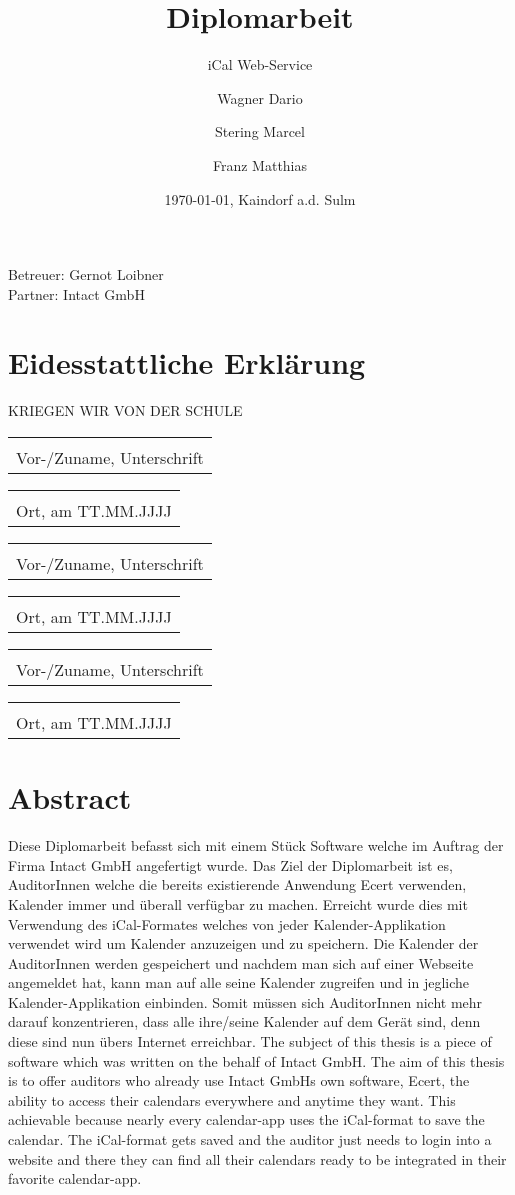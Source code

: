 \documentclass[12pt]{scrartcl}
\author{
  Wagner Dario
  \and
  Stering Marcel
  \and
  Franz Matthias
}
\title{Diplomarbeit}
\subtitle{iCal Web-Service}
\date{\today{}, Kaindorf a.d. Sulm}
\makeatletter
\newcommand{\titledate}[2][2.5in]{%
  \noindent%
  \begin{tabular}{@{}p{#1}@{}}
    \\ \hline \\[-.75\normalbaselineskip]
    #2
  \end{tabular} \hspace{1in}
  \begin{tabular}{@{}p{#1}@{}}
    \\ \hline \\[-.75\normalbaselineskip]
    Ort, am TT.MM.JJJJ
  \end{tabular}
}
\makeatother
\begin{document}
	\begin{titlepage}
		\maketitle
		\begin{center}
			Betreuer: Gernot Loibner\\
			Partner: Intact GmbH
		\end{center}
	\end{titlepage}
	
\section*{Eidesstattliche Erklärung}
\label{sec:eidesstattliche-erklaerung}
KRIEGEN WIR VON DER SCHULE
\vspace*{30px}

\titledate{Vor-/Zuname, Unterschrift}
\vspace*{30px}

\titledate{Vor-/Zuname, Unterschrift}
\vspace{30px}

\titledate{Vor-/Zuname, Unterschrift}
\pagebreak

\section*{Abstract}
\label{sec:abstract}
Diese Diplomarbeit befasst sich mit einem Stück Software welche im Auftrag der Firma Intact GmbH angefertigt wurde. Das Ziel der Diplomarbeit ist es, AuditorInnen welche die bereits existierende Anwendung Ecert verwenden, Kalender immer und überall verfügbar zu machen. Erreicht wurde dies mit Verwendung des iCal-Formates welches von jeder Kalender-Applikation verwendet wird um Kalender anzuzeigen und zu speichern. Die Kalender der AuditorInnen werden gespeichert und nachdem man sich auf einer Webseite angemeldet hat, kann man auf alle seine Kalender zugreifen und in jegliche Kalender-Applikation einbinden. Somit müssen sich AuditorInnen nicht mehr darauf konzentrieren, dass alle ihre/seine Kalender auf dem Gerät sind, denn diese sind nun übers Internet erreichbar. 
\vspace{20px}
\linebreak
The subject of this thesis is a piece of software which was written on the behalf of Intact GmbH. The aim of this thesis is to offer auditors who already use Intact GmbHs own software, Ecert, the ability to access their calendars everywhere and anytime they want. This achievable because nearly every calendar-app uses the iCal-format to save the calendar. The iCal-format gets saved and the auditor just needs to login into a website and there they can find all their calendars ready to be integrated in their favorite calendar-app.
\pagebreak
\end{document}
